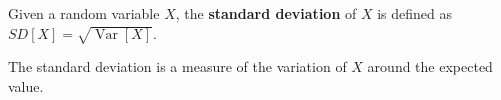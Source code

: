 \documentclass[12pt]{article}
\DeclareMathOperator{\Var}{Var}
\begin{document}
Given a random variable $X$, the \textbf{standard deviation} of $X$ is defined as\\
$SD[X] = \sqrt{\Var[X]}$.\\
\par
The standard deviation is a measure of the variation of $X$ around the expected value.
\end{document}
